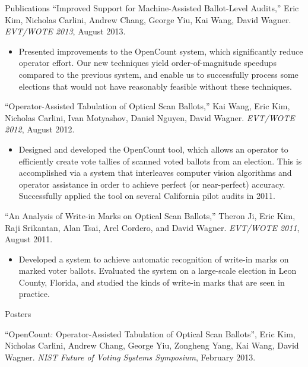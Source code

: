 \documentclass{resume}
\begin{document}
\begin{component}{Publications}
\vspace{0.5em}
``Improved Support for Machine-Assisted Ballot-Level Audits,'' Eric Kim, Nicholas Carlini, Andrew Chang, George Yiu, Kai Wang, David Wagner. \emph{EVT/WOTE 2013}, August 2013.
    \begin{itemize}
        \vspace{-0.5em}\item[] Presented improvements to the OpenCount system,
        which significantly reduce operator effort.
        Our new techniques yield order-of-magnitude speedups compared
        to the previous system, and enable us to successfully process some
        elections that would not have reasonably feasible without these
        techniques.
    \end{itemize}
    
``Operator-Assisted Tabulation of Optical Scan Ballots,'' Kai Wang, Eric Kim, Nicholas Carlini, Ivan Motyashov, Daniel Nguyen, David Wagner. \emph{EVT/WOTE 2012}, August 2012.
        \begin{itemize}
        \vspace{-0.5em}\item[] Designed and developed the OpenCount tool, which allows an operator
to efficiently create vote tallies of scanned voted ballots from an election. This is accomplished via a system 
that interleaves computer vision algorithms and operator assistance in order to achieve perfect (or near-perfect) accuracy.
Successfully applied the tool on several California pilot audits in 2011. 
        \end{itemize}

``An Analysis of Write-in Marks on Optical Scan Ballots,'' Theron Ji, Eric Kim, Raji Srikantan, Alan Tsai, Arel Cordero, and David Wagner. \emph{EVT/WOTE 2011}, August 2011.
	\begin{itemize}
	\vspace{-0.5em}\item[] Developed a system to achieve automatic recognition of write-in marks on marked voter ballots. Evaluated the system on
				       a large-scale election in Leon County, Florida, and studied the kinds of write-in marks that are seen in practice.
	\end{itemize}
\end{component}

\vspace{-0.5em}

\begin{component}{Posters}

``OpenCount: Operator-Assisted Tabulation of Optical Scan Ballots'', Eric Kim, Nicholas Carlini, Andrew Chang, George Yiu, Zongheng Yang, Kai Wang, David Wagner. \emph{NIST Future of Voting Systems Symposium}, February 2013. 
\end{component}
\end{document}
